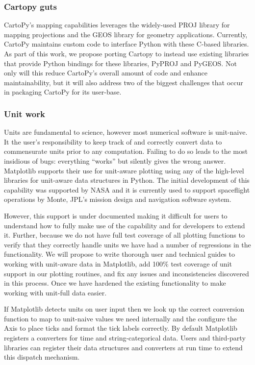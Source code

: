 \documentclass[12pt]{article}
\numberwithin{page}{section}
\begin{document}
\subsubsection{Cartopy guts}
CartoPy's mapping capabilities leverages the widely-used PROJ library
for mapping projections and the GEOS library for geometry
applications. Currently, CartoPy maintains custom code to interface
Python with these C-based libraries. As part of this work, we propose
porting Cartopy to instead use existing libraries that provide Python
bindings for these libraries, PyPROJ and PyGEOS. Not only will this
reduce CartoPy's overall amount of code and enhance maintainability,
but it will also address two of the biggest challenges that occur in
packaging CartoPy for its user-base.


\subsubsection{Unit work}

Units are fundamental to science, however most numerical software is
unit-naive.  It the user's responsibility to keep track of and
correctly convert data to commensurate units prior to any computation.
Failing to do so leads to the most insidious of bugs: everything
``works'' but silently gives the wrong answer.  Matplotlib supports
their use for unit-aware plotting using any of the high-level
libraries for unit-aware data structures in Python.  The initial
development of this capability was supported by NASA and it is
currently used to support spaceflight operations by Monte, JPL's
mission design and navigation software system.

However, this support is under documented making it difficult for
users to understand how to fully make use of the capability and for
developers to extend it.  Further, because we do not have full test
coverage of all plotting functions to verify that they correctly
handle units we have had a number of regressions in the functionality.
We will propose to write thorough user and technical guides to working
with unit-aware data in Matplotlib, add 100\% test coverage of unit
support in our plotting routines, and fix any issues and
inconsistencies discovered in this process.  Once we have hardened the
existing functionality to make working with unit-full data easier.

If Matplotlib detects units on user input then we look up the correct
conversion function to map to unit-naive values we need internally and
the configure the Axis to place ticks and format the tick labels
correctly.  By default Matplotlib registers a converters for time and
string-categorical data. Users and third-party libraries can register
their data structures and converters at run time to extend this
dispatch mechanism.
\end{document}
